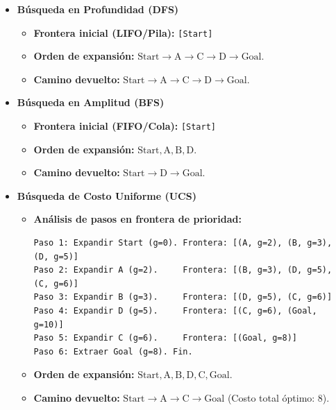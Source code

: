 \begin{itemize}
    \item[\textbf{a.}] \textbf{Búsqueda en Profundidad (DFS)}
    \begin{itemize}
        \item \textbf{Frontera inicial (LIFO/Pila):} \texttt{[Start]}
        \item \textbf{Orden de expansión:} $\text{Start} \rightarrow \text{A} \rightarrow \text{C} \rightarrow \text{D} \rightarrow \text{Goal}$.
        \item \textbf{Camino devuelto:} $\text{Start} \rightarrow \text{A} \rightarrow \text{C} \rightarrow \text{D} \rightarrow \text{Goal}$.
    \end{itemize}

    \item[\textbf{b.}] \textbf{Búsqueda en Amplitud (BFS)}
    \begin{itemize}
        \item \textbf{Frontera inicial (FIFO/Cola):} \texttt{[Start]}
        \item \textbf{Orden de expansión:} $\text{Start}, \text{A}, \text{B}, \text{D}$.
        \item \textbf{Camino devuelto:} $\text{Start} \rightarrow \text{D} \rightarrow \text{Goal}$.
    \end{itemize}

    \item[\textbf{c.}] \textbf{Búsqueda de Costo Uniforme (UCS)}
    \begin{itemize}
        \item \textbf{Análisis de pasos en frontera de prioridad:}

        \begin{lstlisting}
Paso 1: Expandir Start (g=0). Frontera: [(A, g=2), (B, g=3), (D, g=5)]
Paso 2: Expandir A (g=2).     Frontera: [(B, g=3), (D, g=5), (C, g=6)]
Paso 3: Expandir B (g=3).     Frontera: [(D, g=5), (C, g=6)]
Paso 4: Expandir D (g=5).     Frontera: [(C, g=6), (Goal, g=10)]
Paso 5: Expandir C (g=6).     Frontera: [(Goal, g=8)]
Paso 6: Extraer Goal (g=8). Fin.
        \end{lstlisting}
        \item \textbf{Orden de expansión:} $\text{Start}, \text{A}, \text{B}, \text{D}, \text{C}, \text{Goal}$.
        \item \textbf{Camino devuelto:} $\text{Start} \rightarrow \text{A} \rightarrow \text{C} \rightarrow \text{Goal}$ (Costo total óptimo: 8).
    \end{itemize}
\end{itemize}

